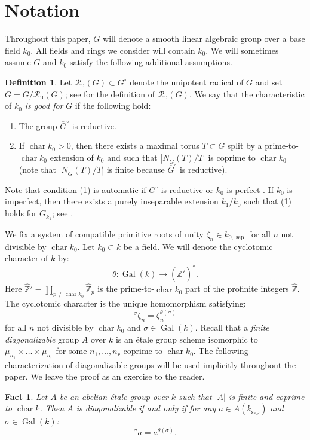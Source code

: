 \documentclass[12pt]{amsart}
\numberwithin{equation}{section}
\newtheorem{fact}[theorem]{Fact}
\theoremstyle{definition}
\newtheorem{definition}[theorem]{Definition}
\newcommand{\bZ}{\mathbb{Z}}
\newcommand{\Ru}{\mathcal{R}_{\mathrm{u}}}
\newcommand{\Gal}{\operatorname{Gal}}
\newcommand{\sep}{\operatorname{sep}}
\newcommand{\Char}{\operatorname{char}}
\newcommand{\ksep}{k_{\sep}}
\begin{document}

\section{Notation}\label{sect.notation}

Throughout this paper, $G$ will denote a smooth linear algebraic group over a base field $k_0$. All fields and rings we consider will contain $k_0$. We will sometimes assume $G$ and $k_0$ satisfy the following additional assumptions.
\begin{definition}\label{def.char}
    Let $\Ru(G)\subset G^{\circ}$ denote the unipotent radical of $G$ and set $\overline{G} = G/\Ru(G)$; see \cite[Definition 6.44]{milne2017algebraic} for the definition of $\Ru(G)$.
    We say that the characteristic of $k_0$ \emph{is good for} $G$ if the following hold:
    \begin{enumerate}
        \item The group $\overline{G}^{\circ}$ is reductive.
        \item If $\Char k_0> 0$, then there exists a maximal torus $T\subset \overline{G}$ split by a prime-to-$\Char k_0$ extension of $k_0$ and such that $|N_{\overline{G}}(T)/T|$ is coprime to $\Char k_0$ (note that $|N_{\overline{G}}(T)/T|$ is finite because $\overline{G}^{\circ}$ is reductive).
    \end{enumerate}
    Note that condition (1) is automatic if $G^{\circ}$ is reductive or $k_0$ is perfect \cite[Proposition 19.11]{milne2017algebraic}. If $k_0$ is imperfect, then there exists a purely inseparable extension $k_1/k_0$ such that (1) holds for $G_{k_1}$; see \cite[Proposition 1.1.9(2)]{conrad-gabber-prasad}.
\end{definition}

We fix a system of compatible primitive roots of unity $\zeta_n \in  k_{0,\sep}$ for all $n$ not divisible by $\Char k_0$. Let $k_0\subset k$ be a field. We will denote the cyclotomic character of $k$ by:
$$\theta: \Gal(k) \to (\hat{\bZ}')^*.$$
Here $ \hat{\bZ}' = \prod_{p\neq \Char k_0} \hat{\bZ}_p$ is the prime-to-$\Char k_0$ part of the profinite integers $\hat{\bZ}$.
The cyclotomic character is the unique homomorphism satisfying:
$$ {}^\sigma \zeta_n = \zeta_n^{\theta(\sigma)}$$
for all $n$ not divisible by $\Char k_0$ and $\sigma\in \Gal(k)$. Recall that a \emph{finite diagonalizable} group $A$ over $k$ is an \'etale group scheme isomorphic to $\mu_{n_1}\times \dots \times \mu_{n_r}$ for some $n_1,\dots,n_r$ coprime to $\Char k_0$. The following characterization of diagonalizable groups will be used implicitly throughout the paper. We leave the proof as an exercise to the reader.
\begin{fact}\label{fact.split_diag}
    Let $A$ be an abelian \'etale group over $k$ such that $|A|$ is finite and coprime to $\Char k$. Then $A$ is diagonalizable if and only if for any $a\in A(\ksep)$ and $\sigma\in \Gal(k)$:
    \begin{equation}\label{def.split_diag}
    {}^{\sigma} a = a^{\theta(\sigma)}.
    \end{equation}
\end{fact}
\end{document}
